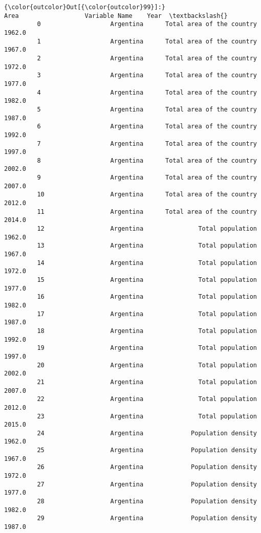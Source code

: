 \documentclass[11pt]{article}
\begin{document}
\begin{Verbatim}[commandchars=\\\{\}]
{\color{outcolor}Out[{\color{outcolor}99}]:}                          Area                  Variable Name    Year  \textbackslash{}
         0                   Argentina      Total area of the country  1962.0   
         1                   Argentina      Total area of the country  1967.0   
         2                   Argentina      Total area of the country  1972.0   
         3                   Argentina      Total area of the country  1977.0   
         4                   Argentina      Total area of the country  1982.0   
         5                   Argentina      Total area of the country  1987.0   
         6                   Argentina      Total area of the country  1992.0   
         7                   Argentina      Total area of the country  1997.0   
         8                   Argentina      Total area of the country  2002.0   
         9                   Argentina      Total area of the country  2007.0   
         10                  Argentina      Total area of the country  2012.0   
         11                  Argentina      Total area of the country  2014.0   
         12                  Argentina               Total population  1962.0   
         13                  Argentina               Total population  1967.0   
         14                  Argentina               Total population  1972.0   
         15                  Argentina               Total population  1977.0   
         16                  Argentina               Total population  1982.0   
         17                  Argentina               Total population  1987.0   
         18                  Argentina               Total population  1992.0   
         19                  Argentina               Total population  1997.0   
         20                  Argentina               Total population  2002.0   
         21                  Argentina               Total population  2007.0   
         22                  Argentina               Total population  2012.0   
         23                  Argentina               Total population  2015.0   
         24                  Argentina             Population density  1962.0   
         25                  Argentina             Population density  1967.0   
         26                  Argentina             Population density  1972.0   
         27                  Argentina             Population density  1977.0   
         28                  Argentina             Population density  1982.0   
         29                  Argentina             Population density  1987.0   

\end{Verbatim}
\end{document}
